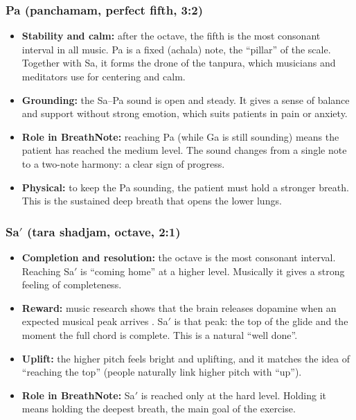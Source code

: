 \documentclass[12pt,a4paper]{article}
\newcommand{\Sah}{Sa\ensuremath{'}}     %
\begin{document}
\subsubsection{Pa (panchamam, perfect fifth, 3:2)}
\begin{itemize}
  \item \textbf{Stability and calm:} after the octave, the fifth is the most consonant interval in all music. Pa is a fixed (achala) note, the ``pillar'' of the scale. Together with Sa, it forms the drone of the tanpura, which musicians and meditators use for centering and calm.
  \item \textbf{Grounding:} the Sa--Pa sound is open and steady. It gives a sense of balance and support without strong emotion, which suits patients in pain or anxiety.
  \item \textbf{Role in BreathNote:} reaching Pa (while Ga is still sounding) means the patient has reached the medium level. The sound changes from a single note to a two-note harmony: a clear sign of progress.
  \item \textbf{Physical:} to keep the Pa sounding, the patient must hold a stronger breath. This is the sustained deep breath that opens the lower lungs.
\end{itemize}

\subsubsection{\Sah{} (tara shadjam, octave, 2:1)}
\begin{itemize}
  \item \textbf{Completion and resolution:} the octave is the most consonant interval. Reaching \Sah{} is ``coming home'' at a higher level. Musically it gives a strong feeling of completeness.
  \item \textbf{Reward:} music research shows that the brain releases dopamine when an expected musical peak arrives \cite{salimpoor}. \Sah{} is that peak: the top of the glide and the moment the full chord is complete. This is a natural ``well done''.
  \item \textbf{Uplift:} the higher pitch feels bright and uplifting, and it matches the idea of ``reaching the top'' (people naturally link higher pitch with ``up'').
  \item \textbf{Role in BreathNote:} \Sah{} is reached only at the hard level. Holding it means holding the deepest breath, the main goal of the exercise.
\end{itemize}
\end{document}
